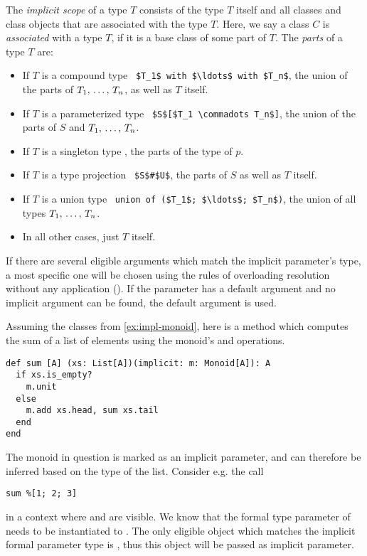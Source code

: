 The {\em implicit scope} of a type $T$ consists of the type $T$ itself and all classes and class objects that are associated with the type $T$. Here, we say a class $C$ is {\em associated} with a type $T$, if it is a base class of some part of $T$. The {\em parts} of a type $T$ are:
\begin{itemize}
  \item If $T$ is a compound type ~\lstinline!$T_1$ with $\ldots$ with $T_n$!, the union of the parts of $T_1 ,\, \ldots ,\, T_n$, as well as $T$ itself.
  \item If $T$ is a parameterized type ~\lstinline!$S$[$T_1 \commadots T_n$]!, the union of the parts of $S$ and $T_1 ,\, \ldots ,\, T_n$. 
  \item If $T$ is a singleton type , the parts of the type of $p$. 
  \item If $T$ is a type projection ~\lstinline!$S$#$U$!, the parts of $S$ as well as $T$ itself.
  \item If $T$ is a union type ~\lstinline!union of ($T_1$; $\ldots$; $T_n$)!, the union of all types $T_1 ,\, \ldots ,\, T_n$. 
  \item In all other cases, just $T$ itself. 
\end{itemize}

If there are several eligible arguments which match the implicit parameter's type, a most specific one will be chosen using the rules of overloading resolution without any application (). If the parameter has a default argument and no implicit argument can be found, the default argument is used. 

\example Assuming the classes from \ref{ex:impl-monoid}, here is a method which computes the sum of a list of elements using the monoid's  and  operations.
\begin{lstlisting}
def sum [A] (xs: List[A])(implicit: m: Monoid[A]): A 
  if xs.is_empty?
    m.unit
  else
    m.add xs.head, sum xs.tail
  end
end
\end{lstlisting}

The monoid in question is marked as an implicit parameter, and can therefore be inferred based on the type of the list. Consider e.g. the call
\begin{lstlisting}
sum %[1; 2; 3]
\end{lstlisting}
in a context where  and  are visible. We know that the formal type parameter  of  needs to be instantiated to . The only eligible object which matches the implicit formal parameter type  is , thus this object will be passed as implicit parameter. 






